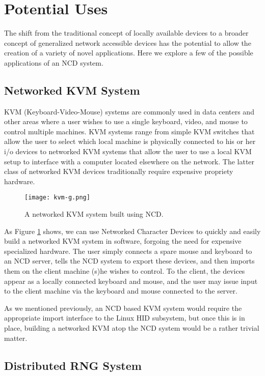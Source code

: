 \documentclass[11pt,twocolumn]{article}
\begin{document}
\section{Potential Uses}
\label{sec:potentialuses}

The shift from the traditional concept of locally available devices to a
broader concept of generalized network accessible devices has the
potential to allow the creation of a variety of novel
applications. Here we explore a few of the possible applications of an
NCD system.

\subsection{Networked KVM System}
\label{sec:networkedkvm}

KVM (Keyboard-Video-Mouse) systems are commonly used in data centers
and other areas where a user wishes to use a single keyboard, video,
and mouse to control multiple machines. KVM systems range from simple KVM
switches that allow the user to select which local machine is
physically connected to his or her i/o devices to
networked KVM systems that allow the user to use a
local KVM setup to interface with a computer located elsewhere on the
network. The latter class of networked KVM devices traditionally require
expensive propriety hardware.

\begin{figure}[h]
  \centering
  \texttt{[image: kvm-g.png]}
  \caption{A networked KVM system built using NCD.}
  \label{fig:kvm}
\end{figure}

As Figure \ref{fig:kvm} shows, we can use Networked Character Devices
to quickly and easily build a networked KVM system in software,
forgoing the need for expensive specialized hardware. The user simply
connects a spare mouse and keyboard to an NCD server, tells the NCD
system to export these devices, and then imports them on the client
machine (s)he wishes to control. To the client, the devices appear as
a locally connected keyboard and mouse, and the user may issue input to
the client machine via the keyboard and mouse connected to the
server.

As we mentioned previously, an NCD based KVM system would require the
appropriate import interface to the Linux HID subsystem, but once this is
in place, building a networked KVM atop the NCD system would be a
rather trivial matter.

\subsection{Distributed RNG System}
\label{sec:distributedrng}
\end{document}
